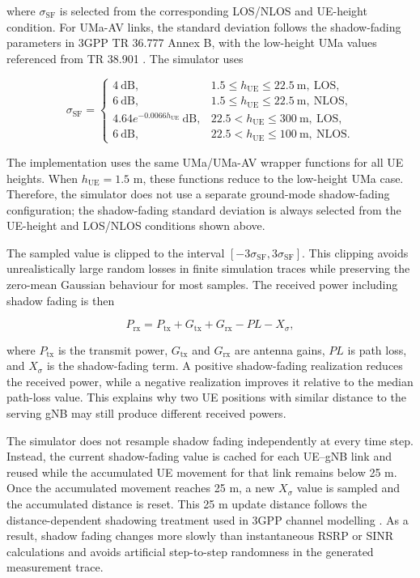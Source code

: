 where \(\sigma_{\mathrm{SF}}\) is selected from the corresponding LOS/NLOS and UE-height condition. For UMa-AV links, the standard deviation follows the shadow-fading parameters in 3GPP TR 36.777 Annex B, with the low-height UMa values referenced from TR 38.901 \cite{3gpp_36777,3gpp_38901}. The simulator uses

\begin{equation}
\sigma_{\mathrm{SF}} =
\begin{cases}
4~\mathrm{dB}, & 1.5\le h_{\mathrm{UE}}\le22.5~\mathrm{m},~\mathrm{LOS},\\
6~\mathrm{dB}, & 1.5\le h_{\mathrm{UE}}\le22.5~\mathrm{m},~\mathrm{NLOS},\\
4.64e^{-0.0066h_{\mathrm{UE}}}~\mathrm{dB}, & 22.5<h_{\mathrm{UE}}\le300~\mathrm{m},~\mathrm{LOS},\\
6~\mathrm{dB}, & 22.5<h_{\mathrm{UE}}\le100~\mathrm{m},~\mathrm{NLOS}.
\end{cases}
\end{equation}

The implementation uses the same UMa/UMa-AV wrapper functions for all UE heights. When \(h_{\mathrm{UE}}=1.5\) m, these functions reduce to the low-height UMa case. Therefore, the simulator does not use a separate ground-mode shadow-fading configuration; the shadow-fading standard deviation is always selected from the UE-height and LOS/NLOS conditions shown above.

The sampled value is clipped to the interval \([-3\sigma_{\mathrm{SF}},3\sigma_{\mathrm{SF}}]\). This clipping avoids unrealistically large random losses in finite simulation traces while preserving the zero-mean Gaussian behaviour for most samples. The received power including shadow fading is then

\begin{equation}
    P_{\mathrm{rx}} = P_{\mathrm{tx}} + G_{\mathrm{tx}} + G_{\mathrm{rx}} - PL - X_{\sigma},
\end{equation}

where \(P_{\mathrm{tx}}\) is the transmit power, \(G_{\mathrm{tx}}\) and \(G_{\mathrm{rx}}\) are antenna gains, \(PL\) is path loss, and \(X_{\sigma}\) is the shadow-fading term. A positive shadow-fading realization reduces the received power, while a negative realization improves it relative to the median path-loss value. This explains why two UE positions with similar distance to the serving gNB may still produce different received powers.

The simulator does not resample shadow fading independently at every time step. Instead, the current shadow-fading value is cached for each UE--gNB link and reused while the accumulated UE movement for that link remains below 25 m. Once the accumulated movement reaches 25 m, a new \(X_{\sigma}\) value is sampled and the accumulated distance is reset. This 25 m update distance follows the distance-dependent shadowing treatment used in 3GPP channel modelling \cite{3gpp_36777}. As a result, shadow fading changes more slowly than instantaneous RSRP or SINR calculations and avoids artificial step-to-step randomness in the generated measurement trace.

